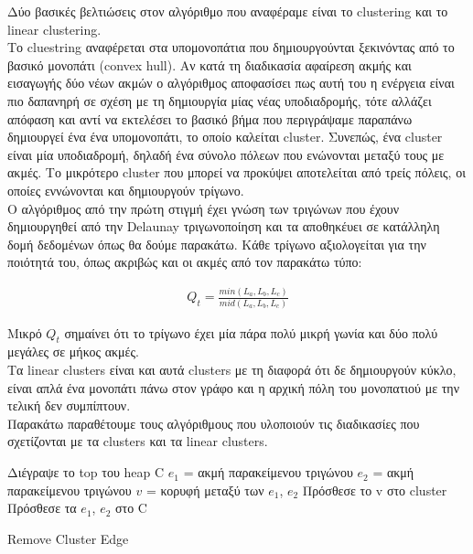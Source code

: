 \documentclass[oneside,12pt]{book}
\theoremstyle{definition}
\begin{document}
Δύο βασικές βελτιώσεις στον αλγόριθμο που αναφέραμε είναι το clustering και το linear clustering. \\

Το cluestring αναφέρεται στα υπομονοπάτια που δημιουργούνται ξεκινόντας από το βασικό μονοπάτι (convex hull). Αν κατά τη διαδικασία αφαίρεση ακμής και εισαγωγής δύο νέων ακμών ο αλγόριθμος αποφασίσει πως αυτή του η ενέργεια είναι πιο δαπανηρή σε σχέση με τη δημιουργία μίας νέας υποδιαδρομής, τότε αλλάζει απόφαση και αντί να εκτελέσει το βασικό βήμα που περιγράψαμε παραπάνω δημιουργεί ένα ένα υπομονοπάτι, το οποίο καλείται cluster. Συνεπώς, ένα cluster είναι μία υποδιαδρομή, δηλαδή ένα σύνολο πόλεων που ενώνονται μεταξύ τους με ακμές. Το μικρότερο cluster που μπορεί να προκύψει αποτελείται από τρείς πόλεις, οι οποίες εννώνονται και δημιουργούν τρίγωνο. \\

Ο αλγόριθμος από την πρώτη στιγμή έχει γνώση των τριγώνων που έχουν δημιουργηθεί από την Delaunay τριγωνοποίηση και τα αποθηκέυει σε κατάλληλη δομή δεδομένων όπως θα δούμε παρακάτω. Κάθε τρίγωνο αξιολογείται για την ποιότητά του, όπως ακριβώς και οι ακμές από τον παρακάτω τύπο:

\begin{align*}
	Q_{t} = \frac{min(L_a, L_b, L_c)}{mid(L_a, L_b, L_c)}
\end{align*}

Μικρό \(Q_t\) σημαίνει ότι το τρίγωνο έχει μία πάρα πολύ μικρή γωνία και δύο πολύ μεγάλες σε μήκος ακμές. \\

Τα linear clusters είναι και αυτά clusters με τη διαφορά ότι δε δημιουργούν κύκλο, είναι απλά ένα μονοπάτι πάνω στον γράφο και η αρχική πόλη του μονοπατιού με την τελική δεν συμπίπτουν. \\

Παρακάτω παραθέτουμε τους αλγόριθμους που υλοποιούν τις διαδικασίες που σχετίζονται με τα clusters και τα linear clusters. \\

\begin{algorithm}[H]
	\SetAlgoLined
	
	Διέγραψε το top του heap C \;
	\(e_1\) = ακμή παρακείμενου τριγώνου \;
	\(e_2\) = ακμή παρακείμενου τριγώνου \;	
	\(v\) = κορυφή μεταξύ των \(e_1\), \(e_2\) \;
	Πρόσθεσε το v στο cluster \;
	Πρόσθεσε τα \(e_1\), \(e_2\) στο C \;
	
	\caption{Remove Cluster Edge}
\end{algorithm}
\end{document}
